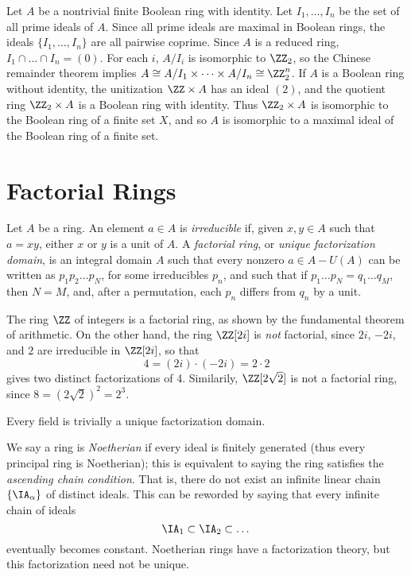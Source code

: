 \begin{example}
    Let $A$ be a nontrivial finite Boolean ring with identity. Let $I_1, \dots, I_n$ be the set of all prime ideals of $A$. Since all prime ideals are maximal in Boolean rings, the ideals $\{ I_1, \dots, I_n \}$ are all pairwise coprime. Since $A$ is a reduced ring, $I_1 \cap \dots \cap I_n = (0)$. For each $i$, $A/I_i$ is isomorphic to $\ZZ_2$, so the Chinese remainder theorem implies $A \cong A/I_1 \times \dots \times A/I_n \cong \ZZ_2^n$. If $A$ is a Boolean ring without identity, the unitization $\ZZ \times A$ has an ideal $(2)$, and the quotient ring $\ZZ_2 \times A$ is a Boolean ring with identity. Thus $\ZZ_2 \times A$ is isomorphic to the Boolean ring of a finite set $X$, and so $A$ is isomorphic to a maximal ideal of the Boolean ring of a finite set.
\end{example}

\section{Factorial Rings}

Let $A$ be a ring. An element $a \in A$ is \emph{irreducible} if, given $x,y \in A$ such that $a = xy$, either $x$ or $y$ is a unit of $A$. A \emph{factorial ring}, or \emph{unique factorization domain}, is an integral domain $A$ such that every nonzero $a \in A - U(A)$ can be written as $p_1 p_2 \dots p_N$, for some irreducibles $p_n$, and such that if $p_1 \dots p_N = q_1 \dots q_M$, then $N = M$, and, after a permutation, each $p_n$ differs from $q_n$ by a unit.

\begin{example}
    The ring $\ZZ$ of integers is a factorial ring, as shown by the fundamental theorem of arithmetic. On the other hand, the ring $\ZZ[2i]$ is \emph{not} factorial, since $2i$, $-2i$, and $2$ are irreducible in $\ZZ[2i]$, so that
    \[ 4 = (2i) \cdot (-2i) = 2 \cdot 2 \]
    gives two distinct factorizations of 4. Similarily, $\ZZ[2\sqrt{2}]$ is not a factorial ring, since $8 = (2\sqrt{2})^2 = 2^3$.
\end{example}

\begin{example}
    Every field is trivially a unique factorization domain.
\end{example}

We say a ring is \emph{Noetherian} if every ideal is finitely generated (thus every principal ring is Noetherian); this is equivalent to saying the ring satisfies the {\it ascending chain condition}. That is, there do not exist an infinite linear chain $\{ \IA_\alpha \}$ of distinct ideals. This can be reworded by saying that every infinite chain of ideals
%
\[ \IA_1 \subset \IA_2 \subset \dots \]
%
eventually becomes constant. Noetherian rings have a factorization theory, but this factorization need not be unique.

